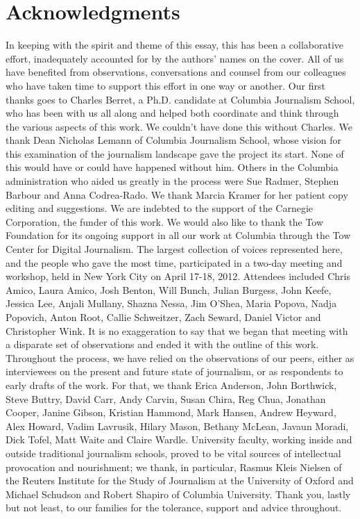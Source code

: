 \chapter{Acknowledgments}
In keeping with the spirit and theme of this essay, this has been a collaborative
effort, inadequately accounted for by the authors’ names on the cover. All of us
have benefited from observations, conversations and counsel from our colleagues
who have taken time to support this effort in one way or another.
Our first thanks goes to Charles Berret, a Ph.D. candidate at Columbia
Journalism School, who has been with us all along and helped both coordinate
and think through the various aspects of this work. We couldn’t have done this
without Charles.
We thank Dean Nicholas Lemann of Columbia Journalism School, whose vision
for this examination of the journalism landscape gave the project its start. None
of this would have or could have happened without him. Others in the Columbia
administration who aided us greatly in the process were Sue Radmer, Stephen
Barbour and Anna Codrea-Rado. We thank Marcia Kramer for her patient
copy editing and suggestions.
We are indebted to the support of the Carnegie Corporation, the funder of this
work. We would also like to thank the Tow Foundation for its ongoing support in
all our work at Columbia through the Tow Center for Digital Journalism.
The largest collection of voices represented here, and the people who gave the
most time, participated in a two-day meeting and workshop, held in New York
City on April 17-18, 2012. Attendees included Chris Amico, Laura Amico, Josh
Benton, Will Bunch, Julian Burgess, John Keefe, Jessica Lee, Anjali Mullany,
Shazna Nessa, Jim O’Shea, Maria Popova, Nadja Popovich, Anton Root, Callie
Schweitzer, Zach Seward, Daniel Victor and Christopher Wink. It is no exaggeration
to say that we began that meeting with a disparate set of observations and
ended it with the outline of this work.
Throughout the process, we have relied on the observations of our peers, either
as interviewees on the present and future state of journalism, or as respondents
to early drafts of the work. For that, we thank Erica Anderson, John Borthwick,
Steve Buttry, David Carr, Andy Carvin, Susan Chira, Reg Chua, Jonathan
Cooper, Janine Gibson, Kristian Hammond, Mark Hansen, Andrew Heyward,
Alex Howard, Vadim Lavrusik, Hilary Mason, Bethany McLean, Javaun Moradi,
Dick Tofel, Matt Waite and Claire Wardle. University faculty, working inside and
outside traditional journalism schools, proved to be vital sources of intellectual
provocation and nourishment; we thank, in particular, Rasmus Kleis Nielsen of
the Reuters Institute for the Study of Journalism at the University of Oxford and
Michael Schudson and Robert Shapiro of Columbia University.
Thank you, lastly but not least, to our families for the tolerance, support and
advice throughout.